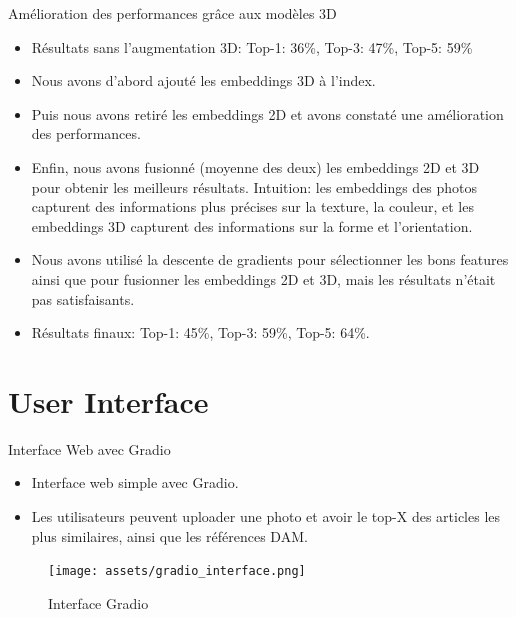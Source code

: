 \documentclass{beamer}
\begin{document}
\begin{frame}{Amélioration des performances grâce aux modèles 3D}
    \begin{itemize}
        \item Résultats sans l'augmentation 3D: Top-1: 36\%, Top-3: 47\%, Top-5: 59\%
        \item Nous avons d'abord ajouté les embeddings 3D à l'index.
        \item Puis nous avons retiré les embeddings 2D et avons constaté une amélioration des performances.
        \item Enfin, nous avons fusionné (moyenne des deux) les embeddings 2D et 3D pour obtenir les meilleurs résultats. Intuition: les embeddings des photos capturent des informations plus précises sur la texture, la couleur, et les embeddings 3D capturent des informations sur la forme et l'orientation.
        \item Nous avons utilisé la descente de gradients pour sélectionner les bons features ainsi que pour fusionner les embeddings 2D et 3D, mais les résultats n'était pas satisfaisants.
        \item Résultats finaux: Top-1: 45\%, Top-3: 59\%, Top-5: 64\%.
    \end{itemize}
\end{frame}

\section{User Interface}
\begin{frame}{Interface Web avec Gradio}
\begin{itemize}
    \item Interface web simple avec Gradio.
    \item Les utilisateurs peuvent uploader une photo et avoir le top-X des articles les plus similaires, ainsi que les références DAM.
\end{itemize}
\begin{figure}
    \centering
    \texttt{[image: assets/gradio\_interface.png]}
    \caption{Interface Gradio}
\end{figure}
\end{frame}
\end{document}
